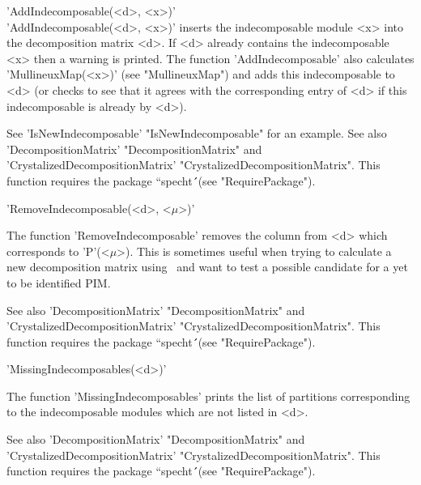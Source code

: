 
'AddIndecomposable(<d>, <x>)'\\

'AddIndecomposable(<d>, <x>)' inserts the indecomposable module <x> into 
the decomposition matrix <d>. If <d> already contains the indecomposable 
<x> then a warning is printed. The function  'AddIndecomposable' also
calculates 'MullineuxMap(<x>)' (see "MullineuxMap") and adds this 
indecomposable to <d> (or checks to see that it agrees with the 
corresponding entry of <d> if this indecomposable is already by <d>).

See 'IsNewIndecomposable' "IsNewIndecomposable" for an example.
See also 'DecompositionMatrix' "DecompositionMatrix" and
'CrystalizedDecompositionMatrix' "CrystalizedDecompositionMatrix". This 
function requires the package ``specht\'\'\ (see "RequirePackage").



'RemoveIndecomposable(<d>, <$\mu$>)'

The function 'RemoveIndecomposable' removes the column from <d> which
corresponds to 'P'(<$\mu$>). This is sometimes useful when trying to 
calculate a new decomposition matrix using \Specht\ and want to test a 
possible candidate for a yet to be identified PIM.

See also 'DecompositionMatrix' "DecompositionMatrix" and
'CrystalizedDecompositionMatrix' "CrystalizedDecompositionMatrix". This 
function requires the package ``specht\'\'\ (see "RequirePackage").



'MissingIndecomposables(<d>)'

The function 'MissingIndecomposables' prints the list of partitions 
corresponding to the indecomposable modules which are not listed in <d>.

See also 'DecompositionMatrix' "DecompositionMatrix" and
'CrystalizedDecompositionMatrix' "CrystalizedDecompositionMatrix". This 
function requires the package ``specht\'\'\ (see "RequirePackage").




